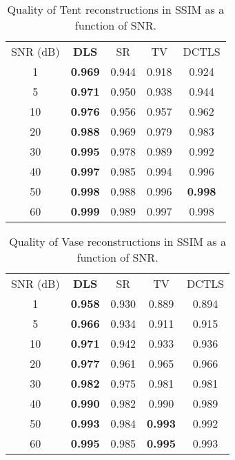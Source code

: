\begin{table}[ht!]
\centering
\begin{tabular}{|c|c|c|c|c|}
\cline{1-5}
SNR (dB) & \bf{DLS} & SR & TV & DCTLS \\
\cline{1-5}
1 & \textbf{0.969} & 0.944 & 0.918 & 0.924 \\ 
\cline{1-5}
5 & \textbf{0.971} & 0.950 & 0.938 & 0.944 \\ 
\cline{1-5}
10 & \textbf{0.976} & 0.956 & 0.957 & 0.962 \\ 
\cline{1-5}
20 & \textbf{0.988} & 0.969 & 0.979 & 0.983 \\ 
\cline{1-5}
30 & \textbf{0.995} & 0.978 & 0.989 & 0.992 \\ 
\cline{1-5}
40 & \textbf{0.997} & 0.985 & 0.994 & 0.996 \\ 
\cline{1-5}
50 & \textbf{0.998} & 0.988 & 0.996 & \textbf{0.998} \\ 
\cline{1-5}
60 & \textbf{0.999} & 0.989 & 0.997 & 0.998 \\ 
\cline{1-5}
\end{tabular}
\caption{Quality of Tent reconstructions in SSIM as a function of SNR.}
\label{tab:pyramid}
\end{table}

\begin{table}[ht!]
\vspace{-4mm}
\centering
\begin{tabular}{|c|c|c|c|c|}
\cline{1-5}
SNR (dB) & \bf{DLS} & SR & TV & DCTLS \\
\cline{1-5}
1 & \textbf{0.958} & 0.930 & 0.889 & 0.894 \\ 
\cline{1-5}
5 & \textbf{0.966} & 0.934 & 0.911 & 0.915 \\ 
\cline{1-5}
10 & \textbf{0.971} & 0.942 & 0.933 & 0.936 \\ 
\cline{1-5}
20 & \textbf{0.977} & 0.961 & 0.965 & 0.966 \\
\cline{1-5} 
30 & \textbf{0.982} & 0.975 & 0.981 & 0.981 \\ 
\cline{1-5}
40 & \textbf{0.990} & 0.982 & 0.990 & 0.989 \\ 
\cline{1-5}
50 & \textbf{0.993} & 0.984 & \textbf{0.993} & 0.992 \\ 
\cline{1-5}
60 & \textbf{0.995} & 0.985 & \textbf{0.995} & 0.993 \\ 
\cline{1-5}
\end{tabular}
\caption{Quality of Vase reconstructions in SSIM as a function of SNR.}
\label{tab:vase}
\end{table}

